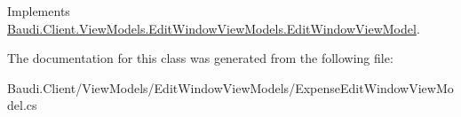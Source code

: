 Implements \hyperlink{class_baudi_1_1_client_1_1_view_models_1_1_edit_window_view_models_1_1_edit_window_view_model_aeae328bfe7608e01ce3c54da0c13f781}{Baudi.\+Client.\+View\+Models.\+Edit\+Window\+View\+Models.\+Edit\+Window\+View\+Model}.



The documentation for this class was generated from the following file\+:\begin{DoxyCompactItemize}
\item 
Baudi.\+Client/\+View\+Models/\+Edit\+Window\+View\+Models/Expense\+Edit\+Window\+View\+Model.\+cs\end{DoxyCompactItemize}
